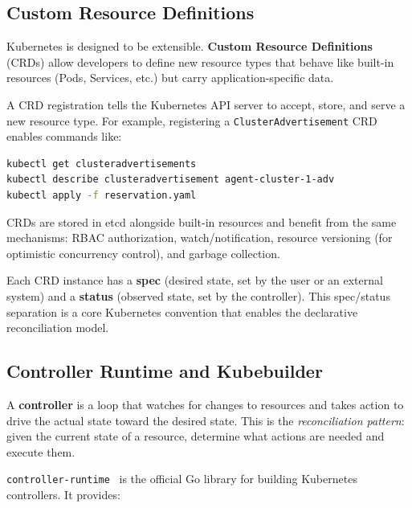 \subsection{Custom Resource Definitions}
\label{subsec:crds}

Kubernetes is designed to be extensible. \textbf{Custom Resource Definitions} (CRDs) allow developers to define new resource types that behave like built-in resources (Pods, Services, etc.) but carry application-specific data.

A CRD registration tells the Kubernetes API server to accept, store, and serve a new resource type. For example, registering a \texttt{ClusterAdvertisement} CRD enables commands like:

\begin{lstlisting}[language=bash, caption={Interacting with a Custom Resource}]
kubectl get clusteradvertisements
kubectl describe clusteradvertisement agent-cluster-1-adv
kubectl apply -f reservation.yaml
\end{lstlisting}

CRDs are stored in etcd alongside built-in resources and benefit from the same mechanisms: RBAC authorization, watch/notification, resource versioning (for optimistic concurrency control), and garbage collection.

Each CRD instance has a \textbf{spec} (desired state, set by the user or an external system) and a \textbf{status} (observed state, set by the controller). This spec/status separation is a core Kubernetes convention that enables the declarative reconciliation model.

\subsection{Controller Runtime and Kubebuilder}
\label{subsec:controller-runtime}

A \textbf{controller} is a loop that watches for changes to resources and takes action to drive the actual state toward the desired state. This is the \textit{reconciliation pattern}: given the current state of a resource, determine what actions are needed and execute them.

\texttt{controller-runtime}~\cite{controller-runtime} is the official Go library for building Kubernetes controllers. It provides:

